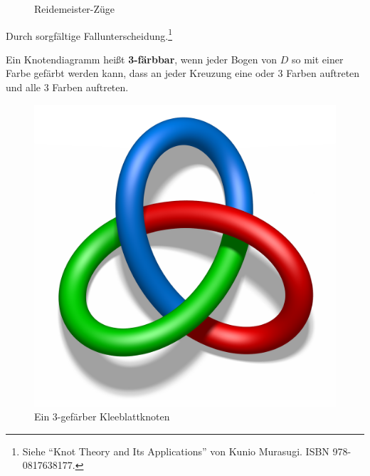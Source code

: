 \begin{figure}[htp]
    \centering
    \qquad\qquad%


    \caption{Reidemeister-Züge}
    \label{fig:reidemeister-zuege}
\end{figure}

\begin{beweis}
    Durch sorgfältige Fallunterscheidung.\footnote{Siehe \enquote{Knot Theory and Its Applications} von Kunio Murasugi. ISBN 978-0817638177.}
\end{beweis}

\begin{definition}%
    Ein Knotendiagramm heißt \textbf{3-färbbar}, 
    wenn jeder Bogen von $D$ so mit einer Farbe gefärbt werden kann, 
    dass an jeder Kreuzung eine oder 3 Farben auftreten und alle 3 
    Farben auftreten.
\end{definition}

\begin{figure}[htp]
    \centering
    \includegraphics[height=0.3\linewidth, keepaspectratio]{figures/tricoloring.png} 

    \caption{Ein 3-gefärber Kleeblattknoten}
    \label{fig:treefoil-knot-three-colors}
\end{figure}


